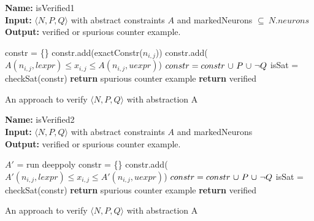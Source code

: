 \begin{algorithm}[t]
  \textbf{Name: } isVerified1 \\
  \textbf{Input: } $\langle N,P,Q \rangle$ with abstract constraints $A$ and markedNeurons $\subseteq ~ N.neurons$ \\
  \textbf{Output: } verified or spurious counter example. 
  \begin{algorithmic}[1]
    \State constr = \{\}
          \State constr.add(exactConstr($n_{i,j}$)) 
        \Else
          \State constr.add($A(n_{i,j},lexpr) \leq x_{i,j} \leq A(n_{i,j},uexpr)$)
        \EndIf
      \EndFor
    \EndFor
    \State $constr = constr ~ {\cup} ~ P ~ {\cup} ~ \neg Q$
    \State isSat = checkSat(constr)
      \State \textbf{return} spurious counter example
    \Else
      \State \textbf{return} verified
    \EndIf
  \end{algorithmic}
  \caption{An approach to verify $\langle N,P,Q \rangle$ with abstraction A}
  \label{algo:verif1}
\end{algorithm}

\begin{algorithm}[t]
  \textbf{Name: } isVerified2 \\
  \textbf{Input: } $\langle N,P,Q \rangle$ with abstract constraints $A$ and markedNeurons \\
  \textbf{Output: } verified or spurious counter example. 
  \begin{algorithmic}[1]
      \State $A'$ = run deeppoly
        \State constr = \{\}
            \State constr.add($A'(n_{i,j},lexpr) \leq x_{i,j} \leq A'(n_{i,j},uexpr)$)
          \EndFor
        \EndFor
        \State $constr = constr ~ {\cup} ~ P ~ {\cup} ~ \neg Q$ 
        \State isSat = checkSat(constr)
          \State \textbf{return} spurious counter example
        \EndIf
      \EndIf
    \EndFor
    \State \textbf{return} verified
  \end{algorithmic}
  \caption{An approach to verify $\langle N,P,Q \rangle$ with abstraction A}
  \label{algo:verif2}
\end{algorithm}



